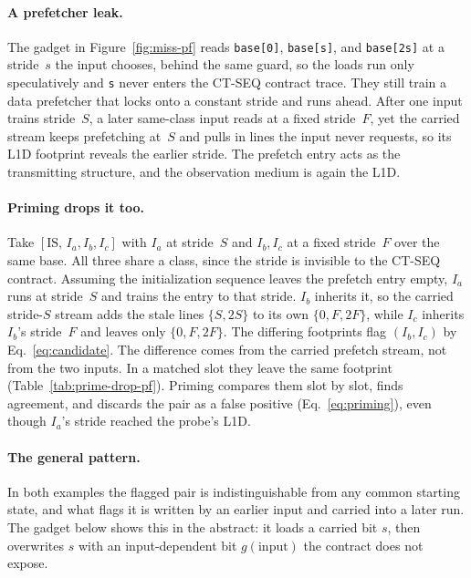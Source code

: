 \documentclass[letterpaper,twocolumn,10pt]{article}
\theoremstyle{definition}
\providecommand{\IS}{\ensuremath{\mathrm{IS}}}
\providecommand{\batch}[1]{\ensuremath{[\IS,\,#1]}}
\begin{document}
\paragraph{A prefetcher leak.}
The gadget in Figure~\ref{fig:miss-pf} reads \texttt{base[0]}, \texttt{base[s]}, and
\texttt{base[2s]} at a stride~$s$ the input chooses, behind the same guard, so the loads run only
speculatively and \texttt{s} never enters the CT-SEQ contract trace. They still train a data prefetcher
that locks onto a constant stride and runs ahead. After
one input trains stride~$S$, a later same-class input reads at a fixed stride~$F$, yet the carried
stream keeps prefetching at~$S$ and pulls in lines the input never requests, so its L1D footprint
reveals the earlier stride. The prefetch entry acts as the transmitting structure, and the observation medium is again
the L1D.

\paragraph{Priming drops it too.}
Take $\batch{I_a,I_b,I_c}$ with $I_a$ at stride~$S$ and $I_b,I_c$ at a fixed stride~$F$ over the
same base. All three share a class, since the stride is invisible to the CT-SEQ contract. Assuming
the initialization sequence leaves the prefetch entry empty, $I_a$ runs at stride~$S$ and trains
the entry to that stride. $I_b$
inherits it, so the carried stride-$S$ stream adds the stale lines $\{S,2S\}$ to its own
$\{0,F,2F\}$, while $I_c$ inherits $I_b$'s stride~$F$ and leaves only $\{0,F,2F\}$. The differing
footprints flag $(I_b,I_c)$ by Eq.~\eqref{eq:candidate}. The difference comes from the carried
prefetch stream, not from the two inputs. In a matched slot they leave the same footprint
(Table~\ref{tab:prime-drop-pf}). Priming compares them slot by slot, finds agreement, and discards
the pair as a false positive (Eq.~\eqref{eq:priming}), even though $I_a$'s stride reached the
probe's L1D.



\paragraph{The general pattern.}
In both examples the flagged pair is indistinguishable from any common starting state, and what
flags it is written by an earlier input and carried into a later run. The gadget below shows this in
the abstract: it loads a carried bit $s$, then overwrites $s$ with an input-dependent bit
$g(\mathrm{input})$ the contract does not expose.
\end{document}
